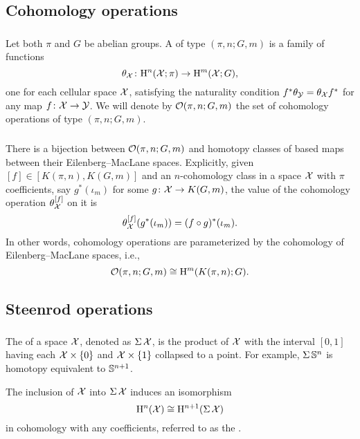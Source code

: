 \subsection{Cohomology operations}

\subsubsection{}
Let both $\pi$ and $G$ be abelian groups.
A  of type $(\pi, n; G, m)$ is a family of functions
\[
\theta_{\mathcal{X}} \colon \mathrm{H}^n(\mathcal{X}; \pi) \to \mathrm{H}^m(\mathcal{X}; G),
\]
one for each cellular space $\mathcal{X}$, satisfying the naturality condition $f^* \theta_{\mathcal{Y}} = \theta_{\mathcal{X}} f^*$ for any map $f \colon \mathcal{X} \to \mathcal{Y}$.
We will denote by $\mathcal{O}(\pi, n; G,m)$ the set of cohomology operations of type $(\pi, n; G,m)$.

\subsubsection{}
There is a bijection between $\mathcal{O}(\pi, n; G,m)$ and homotopy classes of based maps between their Eilenberg--MacLane spaces.
Explicitly, given $[f] \in [K(\pi,n), K(G,m)]$ and an $n$-cohomology class in a space $\mathcal{X}$ with $\pi$ coefficients, say $g^*(\iota_m)$ for some $g \colon \mathcal{X} \to K(G, m)$, the value of the cohomology operation $\theta_{\mathcal{X}}^{[f]}$ on it is
\[
\theta_{\mathcal{X}}^{[f]}(g^*(\iota_m)) = (f \circ g)^*(\iota_m).
\]
In other words, cohomology operations are parameterized by the cohomology of Eilenberg--MacLane spaces, i.e.,
\[
\mathcal{O}(\pi, n; G,m) \cong \mathrm{H}^m(K(\pi,n); G).
\]

\subsection{Steenrod operations}\label{ss:steenrod}

\subsubsection{}

The  of a space $\mathcal{X}$, denoted as $\operatorname{\Sigma} \mathcal{X}$, is the product of $\mathcal{X}$ with the interval $[0,1]$ having each $\mathcal{X} \times \{0\}$ and $\mathcal{X} \times \{1\}$ collapsed to a point.
For example, $\operatorname{\Sigma} \mathbb{S}^n$ is homotopy equivalent to $\mathbb{S}^{n+1}$.

The inclusion of $\mathcal{X}$ into $\operatorname{\Sigma} \mathcal{X}$ induces an isomorphism
\[
\mathrm{H}^n(\mathcal{X}) \cong \mathrm{H}^{n+1}(\operatorname{\Sigma} \mathcal{X})
\]
in cohomology with any coefficients, referred to as the .

